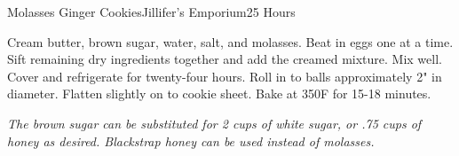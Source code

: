 \begin{recipe}{Molasses Ginger Cookies}{Jillifer's Emporium}{25 Hours}

  Cream butter, brown sugar, water, salt, and molasses. Beat in eggs one at a
  time. Sift remaining dry ingredients together and add the creamed
  mixture. Mix well. Cover and refrigerate for twenty-four hours. Roll in to
  balls approximately 2" in diameter. Flatten slightly on to cookie
  sheet. Bake at 350\0F for 15-18 minutes.
\end{recipe}

\textit{The brown sugar can be substituted for 2 cups of white sugar, or .75
  cups of honey as desired. Blackstrap honey can be used instead of
  molasses.}
